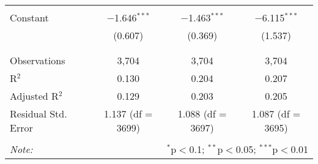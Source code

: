 \begin{table}[!htbp]
\begin{tabular}{@{\extracolsep{5pt}}lccc}
  & & & \\ 
 Constant & $-$1.646$^{***}$ & $-$1.463$^{***}$ & $-$6.115$^{***}$ \\ 
  & (0.607) & (0.369) & (1.537) \\ 
  & & & \\ 
\hline \\[-1.8ex] 
Observations & 3,704 & 3,704 & 3,704 \\ 
R$^{2}$ & 0.130 & 0.204 & 0.207 \\ 
Adjusted R$^{2}$ & 0.129 & 0.203 & 0.205 \\ 
Residual Std. Error & 1.137 (df = 3699) & 1.088 (df = 3697) & 1.087 (df = 3695) \\ 
\hline 
\hline \\[-1.8ex] 
\textit{Note:}  & \multicolumn{3}{r}{$^{*}$p$<$0.1; $^{**}$p$<$0.05; $^{***}$p$<$0.01} \\ 
\end{tabular} 
\end{table} 
